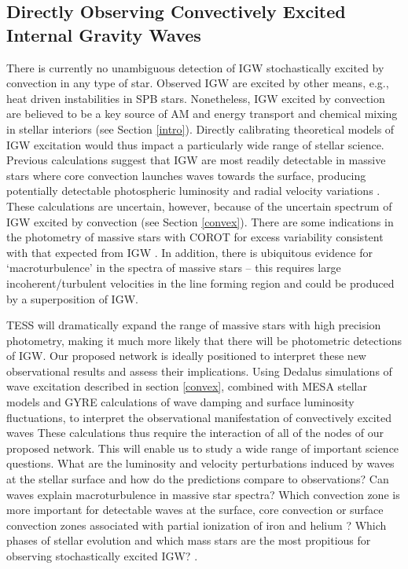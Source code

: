 \subsection{Directly Observing Convectively Excited Internal Gravity Waves}

There is currently no unambiguous detection of IGW stochastically excited by convection in any type of star. {\color{green} Observed IGW are excited by other means, e.g., heat driven instabilities in SPB stars.} Nonetheless, IGW excited by convection are believed to be a key source of AM and energy transport and chemical mixing in stellar interiors (see Section \ref{intro}).  Directly calibrating theoretical models of IGW excitation would thus impact a particularly wide range of stellar science. Previous calculations suggest that IGW are most readily detectable in massive stars where core convection launches waves towards the surface, producing potentially detectable photospheric luminosity and radial velocity variations \citep{samadi2010,shiode2013}. These calculations are uncertain, however, because of the uncertain spectrum of IGW excited by convection (see Section \ref{convex}).  There are some indications in the photometry of massive stars with COROT for excess variability consistent with that expected from IGW \citep{Aerts2015}.  In addition, there is ubiquitous evidence for `macroturbulence' in the spectra of massive stars -- this requires large incoherent/turbulent velocities in the line forming region and could be produced by a superposition of IGW.

TESS will dramatically expand the range of massive stars with high precision photometry, making it much more likely that there will be photometric detections of IGW. Our proposed network is ideally positioned to interpret these new observational results and assess their implications.  Using Dedalus simulations of wave excitation described in section \ref{convex}, combined with MESA stellar models and GYRE calculations of wave damping and surface luminosity fluctuations, to interpret the observational manifestation of convectively excited waves {\color{green} These calculations thus require the interaction of all of the nodes of our proposed network.} This will enable us to study a wide range of important science questions. What are the luminosity and velocity perturbations induced by waves at the stellar surface and how do the predictions compare to observations?   Can waves explain macroturbulence in massive star spectra? Which convection zone is more important for detectable waves at the surface, core convection or surface convection zones associated with partial ionization of iron and helium \citep{Cantiello2009}? Which phases of stellar evolution and which mass stars are the most propitious for observing stochastically excited IGW?  .
